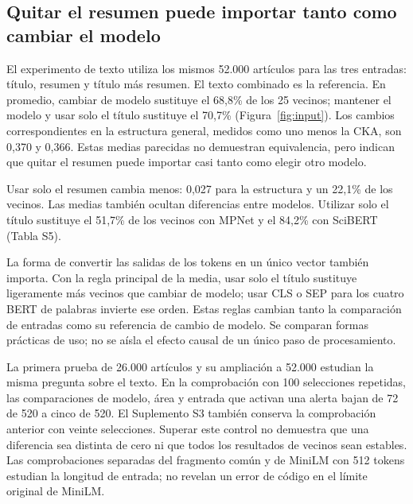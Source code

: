 \documentclass[12pt]{article}
\begin{document}
\FloatBarrier
\subsection{Quitar el resumen puede importar tanto como cambiar el modelo}
El experimento de texto utiliza los mismos 52.000 artículos para las tres entradas: título, resumen y título más resumen. El texto combinado es la referencia. En promedio, cambiar de modelo sustituye el 68,8\% de los 25 vecinos; mantener el modelo y usar solo el título sustituye el 70,7\% (Figura~\ref{fig:input}). Los cambios correspondientes en la estructura general, medidos como uno menos la CKA, son 0,370 y 0,366. Estas medias parecidas no demuestran equivalencia, pero indican que quitar el resumen puede importar casi tanto como elegir otro modelo.

Usar solo el resumen cambia menos: 0,027 para la estructura y un 22,1\% de los vecinos. Las medias también ocultan diferencias entre modelos. Utilizar solo el título sustituye el 51,7\% de los vecinos con MPNet y el 84,2\% con SciBERT (Tabla S5).

La forma de convertir las salidas de los tokens en un único vector también importa. Con la regla principal de la media, usar solo el título sustituye ligeramente más vecinos que cambiar de modelo; usar CLS o SEP para los cuatro BERT de palabras invierte ese orden. Estas reglas cambian tanto la comparación de entradas como su referencia de cambio de modelo. Se comparan formas prácticas de uso; no se aísla el efecto causal de un único paso de procesamiento.

La primera prueba de 26.000 artículos y su ampliación a 52.000 estudian la misma pregunta sobre el texto. En la comprobación con 100 selecciones repetidas, las comparaciones de modelo, área y entrada que activan una alerta bajan de 72 de 520 a cinco de 520. El Suplemento S3 también conserva la comprobación anterior con veinte selecciones. Superar este control no demuestra que una diferencia sea distinta de cero ni que todos los resultados de vecinos sean estables. Las comprobaciones separadas del fragmento común y de MiniLM con 512 tokens estudian la longitud de entrada; no revelan un error de código en el límite original de MiniLM.
\end{document}
